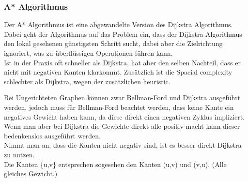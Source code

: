 \documentclass[
../../AuD-Zusammenfassung.tex,
]
{subfiles}
\begin{document}
\subsubsection{A* Algorithmus}
Der A* Algorithmus ist eine abgewandelte Version des Dijkstra Algorithmus. Dabei geht der Algorithmus auf das Problem ein, dass der Dijkstra Algorithmus den lokal gesehenen günstigsten Schritt sucht, dabei aber die Zielrichtung ignoriert, was zu überflüssigen Operationen führen kann.\\
Ist in der Praxis oft schneller als Dijkstra, hat aber den selben Nachteil, dass er nicht mit negativen Kanten klarkommt. Zusätzlich ist die Spacial complexity schlechter als Dijkstra, wegen der zusätzlichen heuristic.\\
\begin{algorithm}[H]
\end{algorithm}
\vspace{20pt}
Bei Ungerichteten Graphen können zwar Bellman-Ford und Dijkstra ausgeführt werden, jedoch muss für Bellman-Ford beachtet werden, dass keine Kante ein negatives Gewicht haben kann, da diese direkt einen negativen Zyklus impliziert. Wenn man aber bei Dijkstra die Gewichte direkt alle positiv macht kann dieser bedenkenslos ausgeführt werden. \\
Nimmt man an, dass die Kanten nicht negativ sind, ist es besser direkt Dijkstra zu nutzen. \\
Die Kanten \{u,v\} entsprechen sogesehen den Kanten (u,v) und (v,u). (Alle gleiches Gewicht.)




\end{document}
